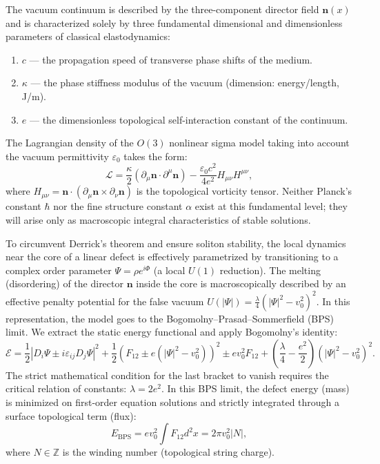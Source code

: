 \documentclass[11pt,a4paper]{article}
\begin{document}
The vacuum continuum is described by the three-component director field $\mathbf{n}(x)$ and is characterized solely by three fundamental dimensional and dimensionless parameters of classical elastodynamics:
\begin{enumerate}
\item $c$ — the propagation speed of transverse phase shifts of the medium.
\item $\kappa$ — the phase stiffness modulus of the vacuum (dimension: energy/length, J/m).
\item $e$ — the dimensionless topological self-interaction constant of the continuum.
\end{enumerate}
The Lagrangian density of the $O(3)$ nonlinear sigma model taking into account the vacuum permittivity $\varepsilon_0$ takes the form:
\begin{equation}
\mathcal{L} = \frac{\kappa}{2} (\partial_\mu \mathbf{n} \cdot \partial^\mu \mathbf{n}) - \frac{\varepsilon_0 c^2}{4 e^2} H_{\mu\nu} H^{\mu\nu},
\label{eq:lagrangian}
\end{equation}
where $H_{\mu\nu} = \mathbf{n} \cdot (\partial_\mu \mathbf{n} \times \partial_\nu \mathbf{n})$ is the topological vorticity tensor. Neither Planck's constant $\hbar$ nor the fine structure constant $\alpha$ exist at this fundamental level; they will arise only as macroscopic integral characteristics of stable solutions.

To circumvent Derrick's theorem and ensure soliton stability, the local dynamics near the core of a linear defect is effectively parametrized by transitioning to a complex order parameter $\Psi = \rho e^{i\Phi}$ (a local $U(1)$ reduction). The melting (disordering) of the director $\mathbf{n}$ inside the core is macroscopically described by an effective penalty potential for the false vacuum $U(|\Psi|) = \frac{\lambda}{4}(|\Psi|^2 - v_0^2)^2$. In this representation, the model goes to the Bogomolny–Prasad–Sommerfield (BPS) limit. We extract the static energy functional and apply Bogomolny's identity:
\begin{equation}
\mathcal{E} = \frac{1}{2} |D_i \Psi \pm i \varepsilon_{ij} D_j \Psi|^2 + \frac{1}{2} \left(F_{12} \pm e(|\Psi|^2 - v_0^2)\right)^2 \pm e v_0^2 F_{12} + \left(\frac{\lambda}{4} - \frac{e^2}{2}\right) (|\Psi|^2 - v_0^2)^2.
\end{equation}
The strict mathematical condition for the last bracket to vanish requires the critical relation of constants: $\lambda = 2e^2$. In this BPS limit, the defect energy (mass) is minimized on first-order equation solutions and strictly integrated through a surface topological term (flux):
\begin{equation}
E_{\text{BPS}} = e v_0^2 \int F_{12} d^2x = 2\pi v_0^2 |N|,
\end{equation}
where $N \in \mathbb{Z}$ is the winding number (topological string charge).
\end{document}

